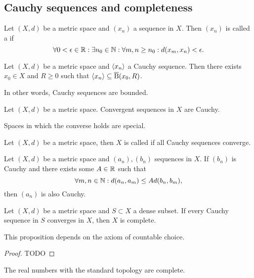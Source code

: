 \subsection{Cauchy sequences and completeness}
\begin{definition}
Let $(X,d)$ be a metric space and $(x_n)$ a sequence in $X$. Then $(x_n)$ is called a  if
\[ \forall 0 < \epsilon \in \mathbb{R}: \exists n_0\in \mathbb{N}: \forall m,n \geq n_0: d(x_m,x_n) < \epsilon.  \]
\end{definition}

\begin{lemma}
Let $(X,d)$ be a metric space and $\left\langle x_n \right\rangle$ a Cauchy sequence. Then there exists $x_0\in X$ and $R\geq 0$ such that $\left\langle x_n \right\rangle\subseteq \operatorname{\overline{B}}(x_0, R)$.
\end{lemma}
In other words, Cauchy sequences are bounded.

\begin{proposition}
Let $(X,d)$ be a metric space. Convergent sequences in $X$ are Cauchy.
\end{proposition}
Spaces in which the converse holds are special.
\begin{definition}
Let $(X,d)$ be a metric space, then $X$ is called  if all Cauchy sequences converge.
\end{definition}

\begin{proposition} \label{CauchyCriterion}
Let $(X,d)$ be a metric space and $(a_n), (b_n)$ sequences in $X$. If $(b_n)$ is Cauchy and there exists some $A\in\mathbb{R}$ such that
\[ \forall m,n\in\mathbb{N}: d(a_n,a_m) \leq A d(b_n,b_m), \]
then $(a_n)$ is also Cauchy.
\end{proposition}

\begin{proposition} \label{completenessCriterion}
Let $(X,d)$ be a metric space and $S\subset X$ a dense subset. If every Cauchy sequence in $S$ converges in $X$, then $X$ is complete.
\end{proposition}
This proposition depends on the axiom of countable choice.
\begin{proof}
TODO
\end{proof}

\begin{lemma}
The real numbers with the standard topology are complete.
\end{lemma}

